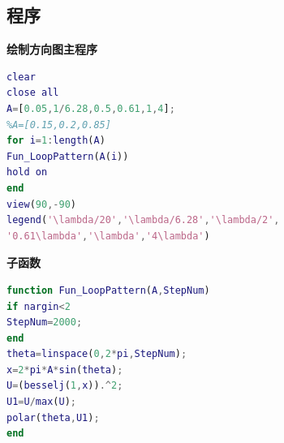 \subsection{程序}
\noindent \textbf{绘制方向图主程序}
\begin{lstlisting}[language={matlab},keywordstyle=\color{blue!70},commentstyle=\color{red!50!green!50!blue!50},frame=shadowbox, rulesepcolor=\color{red!20!green!20!blue!20}] 
%主程序
clear
close all
A=[0.05,1/6.28,0.5,0.61,1,4];
%A=[0.15,0.2,0.85]
for i=1:length(A)
Fun_LoopPattern(A(i))
hold on
end
view(90,-90)
legend('\lambda/20','\lambda/6.28','\lambda/2',
'0.61\lambda','\lambda','4\lambda')
\end{lstlisting}
\noindent \textbf{子函数}
\begin{lstlisting}[language={matlab},keywordstyle=\color{blue!70},commentstyle=\color{red!50!green!50!blue!50},frame=shadowbox, rulesepcolor=\color{red!20!green!20!blue!20}] 
%子函数
function Fun_LoopPattern(A,StepNum)
if nargin<2
StepNum=2000;
end
theta=linspace(0,2*pi,StepNum);
x=2*pi*A*sin(theta);
U=(besselj(1,x)).^2;
U1=U/max(U);
polar(theta,U1);
end

\end{lstlisting}
